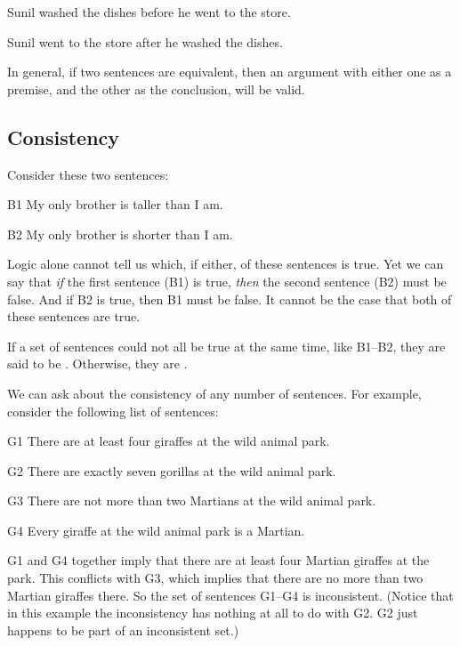 \begin{earg}
\item[] Sunil washed the dishes before he went to the store.
\item[\therefore] Sunil went to the store after he washed the dishes.
\end{earg}

In general, if two sentences are equivalent, then an argument with either one as a premise, and the other as the conclusion, will be valid.

\subsection{Consistency}
Consider these two sentences:
\begin{ekey}
\item[B1] My only brother is taller than I am.
\item[B2] My only brother is shorter than I am.
\end{ekey}
Logic alone cannot tell us which, if either, of these sentences is true. Yet we can say that \emph{if} the first sentence (B1) is true, \emph{then} the second sentence (B2) must be false. And if B2 is true, then B1 must be false. It cannot be the case that both of these sentences are true.

If a set of sentences could not all be true at the same time, like B1--B2, they are said to be . Otherwise, they are .

We can ask about the consistency of any number of sentences. For example, consider the following list of sentences:
\label{MartianGiraffes}
\begin{ekey}
\item[G1] There are at least four giraffes at the wild animal park.
\item[G2] There are exactly seven gorillas at the wild animal park.
\item[G3] There are not more than two Martians at the wild animal park.
\item[G4] Every giraffe at the wild animal park is a Martian.
\end{ekey}
G1 and G4 together imply that there are at least four Martian giraffes at the park. This conflicts with G3, which implies that there are no more than two Martian giraffes there. So the set of sentences G1--G4 is inconsistent. (Notice that in this example the inconsistency has nothing at all to do with G2. G2 just happens to be part of an inconsistent set.)


